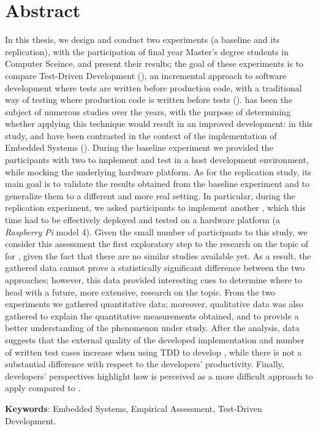 \chapter*{Abstract}
In this thesis, we design and conduct two experiments (\ie a baseline and its replication), with the participation of final year Master's degree students in Computer Sceince, and present their results; the goal of these experiments is to compare Test-Driven Development (\tdd), an incremental approach to software development where tests are written before production code, with a traditional way of testing where production code is written before tests (\ie \notdd). 
\tdd has been the subject of numerous studies over the years, with the purpose of determining whether applying this technique would result in an improved development: in this study, \tdd and \notdd have been contrasted in the context of the implementation of Embedded Systems (\ess).
During the baseline experiment we provided the participants with two \ess to implement and test in a host development environment, while mocking the underlying hardware platform.
As for the replication study, its main goal is to validate the results obtained from the baseline experiment and to generalize them to a different and more real setting. 
In particular, during the replication experiment, we asked participants to implement another \es, which this time had to be effectively deployed and tested on a hardware platform (\ie a \textit{Raspberry Pi} model 4).
Given the small number of participants to this study, we consider this assessment the first exploratory step to the research on the topic of \tdd for \ess, given the fact that there are no similar studies available yet. As a result, the gathered data cannot prove a statistically significant difference between the two approaches; however, this data provided interesting cues to determine where to head with a future, more extensive, research on the topic.
From the two experiments we gathered quantitative data; moreover, qualitative data was also gathered to explain the quantitative measurements obtained, and to provide a better understanding of the phenomenon under study.
After the analysis, data suggests that the external quality of the developed implementation and number of written test cases increase when using TDD to develop \ess, while there is not a substantial difference with respect to the developers' productivity. 
Finally, developers' perspectives highlight how \tdd is perceived as a more difficult approach to apply compared to \notdd.

\noindent \textbf{Keywords}: Embedded Systems, Empirical Assessment, Test-Driven Development.